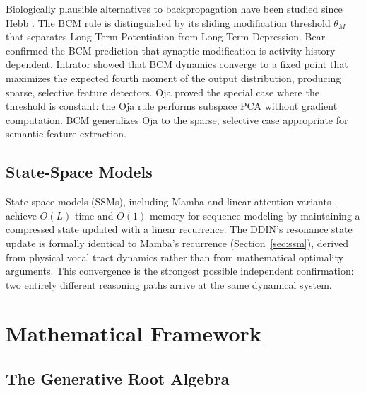 \documentclass{article}
\begin{document}
Biologically plausible alternatives to backpropagation have been studied since Hebb \cite{hebb1949}. The BCM rule \cite{bienenstock1982} is distinguished by its sliding modification threshold $\theta_M$ that separates Long-Term Potentiation from Long-Term Depression. Bear \cite{bear1987} confirmed the BCM prediction that synaptic modification is activity-history dependent. Intrator \cite{intrator1992} showed that BCM dynamics converge to a fixed point that maximizes the expected fourth moment of the output distribution, producing sparse, selective feature detectors. Oja \cite{oja1982} proved the special case where the threshold is constant: the Oja rule performs subspace PCA without gradient computation. BCM generalizes Oja to the sparse, selective case appropriate for semantic feature extraction.

\subsection{State-Space Models}

State-space models (SSMs), including Mamba \cite{gu2022mamba} and linear attention variants \cite{katharopoulos2020}, achieve $O(L)$ time and $O(1)$ memory for sequence modeling by maintaining a compressed state updated with a linear recurrence. The DDIN's resonance state update is formally identical to Mamba's recurrence (Section~\ref{sec:ssm}), derived from physical vocal tract dynamics rather than from mathematical optimality arguments. This convergence is the strongest possible independent confirmation: two entirely different reasoning paths arrive at the same dynamical system.

\section{Mathematical Framework}

\subsection{The Generative Root Algebra}
\label{sec:dhatu}
\end{document}
